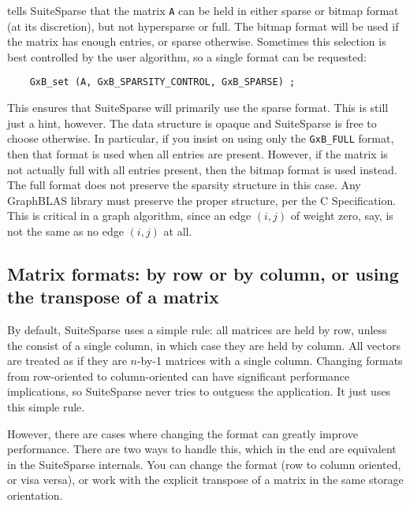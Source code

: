 \documentclass[12pt]{article}
\begin{document}
\noindent
tells SuiteSparse that the matrix \verb'A' can be held in either sparse or
bitmap format (at its discretion), but not hypersparse or full.  The bitmap
format will be used if the matrix has enough entries, or sparse otherwise.
Sometimes this selection is best controlled by the user algorithm, so a single
format can be requested:

    {\footnotesize
    \begin{verbatim}
    GxB_set (A, GxB_SPARSITY_CONTROL, GxB_SPARSE) ; \end{verbatim}}

This ensures that SuiteSparse will primarily use the sparse format.  This is
still just a hint, however.  The data structure is opaque and SuiteSparse is
free to choose otherwise.  In particular, if you insist on using only the
\verb'GxB_FULL' format, then that format is used when all entries are present.
However, if the matrix is not actually full with all entries present, then the
bitmap format is used instead.  The full format does not preserve the sparsity
structure in this case.  Any GraphBLAS library must preserve the proper
structure, per the C Specification.  This is critical in a graph algorithm,
since an edge $(i,j)$ of weight zero, say, is not the same as no edge $(i,j)$
at all.

\subsection{Matrix formats: by row or by column, or using the transpose of
a matrix}

By default, SuiteSparse uses a simple rule:
all matrices are held by row, unless the consist of a single
column, in which case they are held by column.  All vectors are treated as if
they are $n$-by-1 matrices with a single column.  Changing formats from
row-oriented to column-oriented can have significant performance implications,
so SuiteSparse never tries to outguess the application.  It just uses this
simple rule.

However, there are cases where changing the format can greatly improve
performance.  There are two ways to handle this, which in the end are
equivalent in the SuiteSparse internals.  You can change the format (row to
column oriented, or visa versa), or work with the explicit transpose of a
matrix in the same storage orientation.
\end{document}

